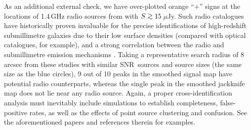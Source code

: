 \documentclass[useAMS,usenatbib,nofootinbib]{mn2e}
\newcommand{\snr}{SNR}
\def\gsim{\mathrel{\lower2.5pt\vbox{\lineskip=0pt\baselineskip=0pt
          \hbox{$>$}\hbox{$\sim$}}}}
\begin{document}
As an additional external check, we have over-plotted orange ``$+$''
signs at the locations of 1.4\,GHz radio sources from \citet{owen2008}
with $S\gsim15$\,$\mu$Jy. Such radio catalogues have historically
proven invaluable for the precise identifications of high-redshift
submillimetre galaxies due to their low surface densities (compared
with optical catalogues, for example), and a strong correlation
between the radio and submillimetre emission mechanisms
\citep[e.g.,][]{smail2000,pope2006,ivison2007,chapin2009b}. Taking a
representative search radius of 8\,arcsec from these studies with
similar \snr\ sources and source sizes (the same size as the blue
circles), 9 out of 10 peaks in the smoothed signal map have potential
radio counterparts, whereas the single peak in the smoothed jackknife
map does not lie near any radio source. Again, a proper
cross-identification analysis must inevitably include simulations to
establish completeness, false-positive rates, as well as the effects
of point source clustering and confusion. See the aforementioned
papers and references therein for examples.
\end{document}
